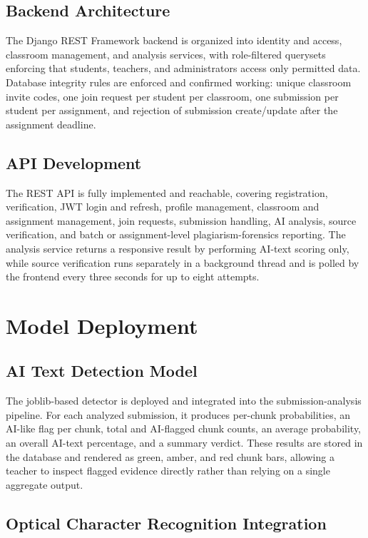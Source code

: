 \documentclass[12pt, a4paper]{report}
\numberwithin{equation}{chapter}
\begin{document}
\subsection{Backend Architecture}

The Django REST Framework backend is organized into identity and access, classroom management, and analysis services, with role-filtered querysets enforcing that students, teachers, and administrators access only permitted data. Database integrity rules are enforced and confirmed working: unique classroom invite codes, one join request per student per classroom, one submission per student per assignment, and rejection of submission create/update after the assignment deadline.

\subsection{API Development}

The REST API is fully implemented and reachable, covering registration, verification, JWT login and refresh, profile management, classroom and assignment management, join requests, submission handling, AI analysis, source verification, and batch or assignment-level plagiarism-forensics reporting. The analysis service returns a responsive result by performing AI-text scoring only, while source verification runs separately in a background thread and is polled by the frontend every three seconds for up to eight attempts.

\section{Model Deployment}

\subsection{AI Text Detection Model}

The joblib-based detector is deployed and integrated into the submission-analysis pipeline. For each analyzed submission, it produces per-chunk probabilities, an AI-like flag per chunk, total and AI-flagged chunk counts, an average probability, an overall AI-text percentage, and a summary verdict. These results are stored in the database and rendered as green, amber, and red chunk bars, allowing a teacher to inspect flagged evidence directly rather than relying on a single aggregate output.

\subsection{Optical Character Recognition Integration}
\end{document}
